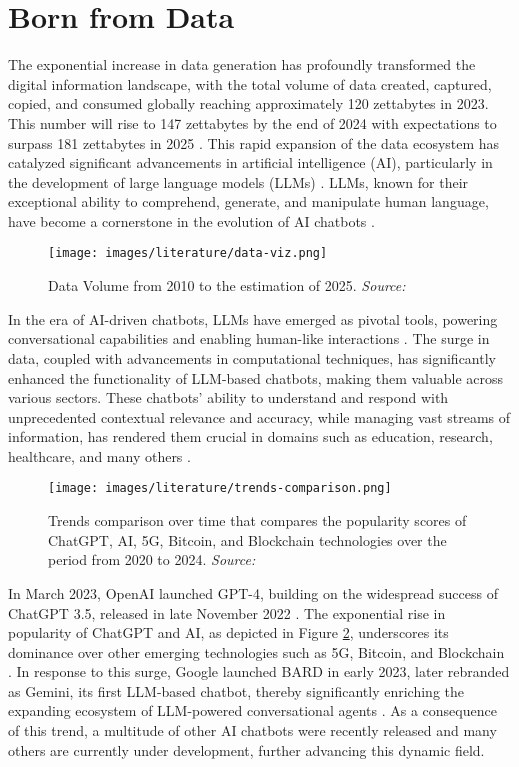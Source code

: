 \section{Born from Data}

The exponential increase in data generation has profoundly transformed the digital information landscape, with the total volume of data created, captured, copied, and consumed globally reaching approximately 120 zettabytes in 2023. This number will rise to 147 zettabytes by the end of 2024 with expectations to surpass 181 zettabytes in 2025 \cite{taylor2023volume}. This rapid expansion of the data ecosystem has catalyzed significant advancements in artificial intelligence (AI), particularly in the development of large language models (LLMs) \cite{zhao2023survey}. LLMs, known for their exceptional ability to comprehend, generate, and manipulate human language, have become a cornerstone in the evolution of AI chatbots \cite{brown2020language}.

\begin{figure}[h!]
    \centering
    \texttt{[image: images/literature/data-viz.png]}
    \caption{Data Volume from 2010 to the estimation of 2025. \textit{Source:} \cite{taylor2023volume}}
    \label{fig:data_volume}
\end{figure}

In the era of AI-driven chatbots, LLMs have emerged as pivotal tools, powering conversational capabilities and enabling human-like interactions \cite{koubaa2023exploring}. The surge in data, coupled with advancements in computational techniques, has significantly enhanced the functionality of LLM-based chatbots, making them valuable across various sectors. These chatbots' ability to understand and respond with unprecedented contextual relevance and accuracy, while managing vast streams of information, has rendered them crucial in domains such as education, research, healthcare, and many others \cite{dam2024complete}.

\begin{figure}[h!]
    \centering
    \texttt{[image: images/literature/trends-comparison.png]}
    \caption{Trends comparison over time that compares the popularity scores of ChatGPT, AI, 5G, Bitcoin, and Blockchain technologies over the period from 2020 to 2024. \textit{Source:} \cite{googletrends2023}}
    \label{fig:chatgpt_popularity}
\end{figure}

In March 2023, OpenAI launched GPT-4, building on the widespread success of ChatGPT 3.5, released in late November 2022 \cite{bahrini2023chatgpt, zhang2023one}. The exponential rise in popularity of ChatGPT and AI, as depicted in Figure \ref{fig:chatgpt_popularity}, underscores its dominance over other emerging technologies such as 5G, Bitcoin, and Blockchain \cite{googletrends2023}. In response to this surge, Google launched BARD in early 2023, later rebranded as Gemini, its first LLM-based chatbot, thereby significantly enriching the expanding ecosystem of LLM-powered conversational agents \cite{wikipedia2024gemini}. As a consequence of this trend, a multitude of other AI chatbots were recently released and many others are currently under development, further advancing this dynamic field.


